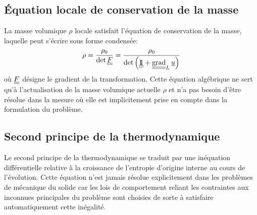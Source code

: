 \documentclass[10pt]{book}
\begin{document}
\subsection{Équation locale de conservation de la masse}
La masse volumique $\rho$ locale satisfait l'équation de conservation de la masse, laquelle peut s'écrire sous forme condensée:
\begin{equation}
\rho= \dfrac{\rho_{0}}{\det\GT}=\dfrac{\rho_{0}}{\det\left(\TU+\tgrad_{L}\Dep\right)}
\label{eq:conserv_mass}
\end{equation}
où $\underline{\underline{F}}$ désigne le gradient de la transformation. Cette équation algébrique ne sert qu'à l'actualisation de la masse volumique actuelle $\rho$ et n'a pas besoin d'être résolue dans la mesure où elle est implicitement prise en compte dans la formulation du problème.
\subsection{Second principe de la thermodynamique}
Le second principe de la thermodynamique se traduit par une inéquation différentielle relative à la croissance de l'entropie d'origine interne au cours de l'évolution. Cette équation n'est jamais résolue explicitement dans les problèmes de mécanique du solide car les lois de comportement reliant les contraintes aux inconnues principales du problème sont choisies de sorte à satisfaire automatiquement cette inégalité.
\end{document}
